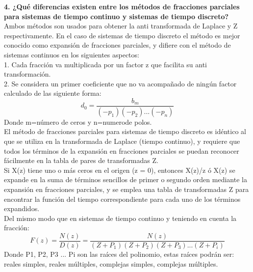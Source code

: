 \documentclass{article}
\begin{document}
	
	\noindent\textbf{4. ¿Qué diferencias existen entre los métodos de fracciones parciales para sistemas de tiempo continuo y sistemas de tiempo discreto?}
	\newline
Ambos métodos son usados para obtener la anti transformada de Laplace y Z respectivamente. En el caso de sistemas de tiempo discreto el método es mejor conocido como expansión de fracciones parciales, y difiere con el método de sistemas continuos en los siguientes aspectos:\\
	    1. Cada fracción va multiplicada por un factor z que facilita su anti transformación.\\
	    2. Se considera un primer coeficiente que no va acompañado de ningún factor calculado de las siguiente forma:\\
	    \[
        d_{0}=\frac{b_{m}} {(−p_{1})(−p_{2})...(−p_{n})}
        \]
        Donde m=número de ceros y n=numerode polos.\\
        
El método de fracciones parciales para sistemas de tiempo discreto es idéntico al que se utiliza en la transformada de Laplace (tiempo continuo), y requiere que todos los términos de la expansión en fracciones parciales se puedan reconocer fácilmente en la tabla de pares de transformadas Z.\\
Si X(z) tiene uno o más ceros en el origen (z = 0), entonces X(z)/z ó X(z) se expande en la suma de términos sencillos de primer o segundo orden mediante la expansión en fracciones parciales, y se emplea una tabla de transformadas Z para encontrar la función del tiempo correspondiente para cada uno de los términos expandidos.\\
	    
Del mismo modo que en sistemas de tiempo continuo y teniendo en cuenta la fracción:\\
\[
F(z)=\frac{N(z)}{D(z)}=\frac{N(z)}{(Z+P_{1})(Z+P_{2})(Z+P_{3})...(Z+P_{i})}
\]
Donde P1, P2, P3 ... Pi son las raíces del polinomio, estas raíces podrán ser: reales simples, reales múltiples, complejas simples, complejas múltiples.
	
\end{document}
